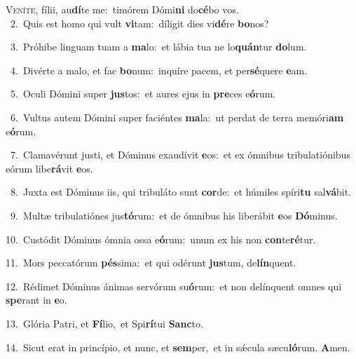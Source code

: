 \lettrine{\initial\textcolor{\initialcolor}{V}}{eníte,} fílii, au\-\textbf{dí}\-te me:~\star timórem Dómi\textbf{ni} do\-\textbf{cé}\-bo vos.\\
{\numbfont\textcolor{\numbcolor}{~2.}}~Quis est homo qui vult \textbf{vi}\-tam:~\star díligit dies vi\-\textbf{dé}\-re \textbf{bo}\-nos?\par
{\numbfont\textcolor{\numbcolor}{~3.}}~Próhibe linguam tuam a \textbf{ma}\-lo:~\star et lábia tua ne lo\-\textbf{quán}\-tur \textbf{do}\-lum.\par
{\numbfont\textcolor{\numbcolor}{~4.}}~Divérte a malo, et fac \textbf{bo}\-num:~\star inquíre pacem, et per\-\textbf{sé}\-quere \textbf{e}\-am.\par
{\numbfont\textcolor{\numbcolor}{~5.}}~Oculi Dómini super \textbf{jus}\-tos:~\star et aures ejus in \textbf{pre}\-ces e\-\textbf{ó}\-rum.\par
{\numbfont\textcolor{\numbcolor}{~6.}}~Vultus autem Dómini super faciéntes \textbf{ma}\-la:~\star ut perdat de terra memóri\textbf{am} e\-\textbf{ó}\-rum.\par
{\numbfont\textcolor{\numbcolor}{~7.}}~Clamavérunt justi, et Dóminus exaudívit \textbf{e}\-os:~\star et ex ómnibus tribulatiónibus eórum libe\-\textbf{rá}\-vit \textbf{e}\-os.\par
{\numbfont\textcolor{\numbcolor}{~8.}}~Juxta est Dóminus iis, qui tribuláto sunt \textbf{cor}\-de:~\star et húmiles spíri\textbf{tu} sal\-\textbf{vá}\-bit.\par
{\numbfont\textcolor{\numbcolor}{~9.}}~Multæ tribulatiónes jus\-\textbf{tó}\-rum:~\star et de ómnibus his liberábit \textbf{e}\-os \textbf{Dó}\-minus.\par
{\numbfont\textcolor{\numbcolor}{10.}}~Custódit Dóminus ómnia ossa e\-\textbf{ó}\-rum:~\star unum ex his non \textbf{con}\-te\-\textbf{ré}\-tur.\par
{\numbfont\textcolor{\numbcolor}{11.}}~Mors peccatórum \textbf{pés}\-sima:~\star et qui odérunt \textbf{jus}\-tum, de\-\textbf{lín}\-quent.\par
{\numbfont\textcolor{\numbcolor}{12.}}~Rédimet Dóminus ánimas servórum su\-\textbf{ó}\-rum:~\star et non delínquent omnes qui \textbf{spe}\-rant in \textbf{e}\-o.\par
{\numbfont\textcolor{\numbcolor}{13.}}~Glória Patri, et \textbf{Fí}\-lio,~\star et Spi\-\textbf{rí}\-tui \textbf{Sanc}\-to.\par
{\numbfont\textcolor{\numbcolor}{14.}}~Sicut erat in princípio, et nunc, et \textbf{sem}\-per,~\star et in sǽcula sæcu\-\textbf{ló}\-rum. \textbf{A}\-men.\par
